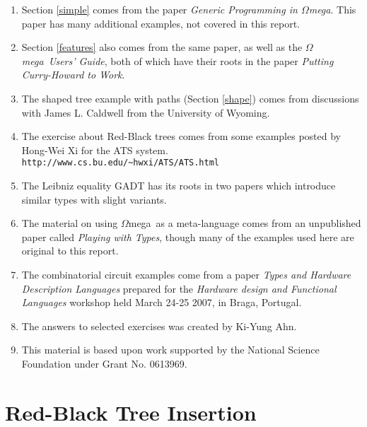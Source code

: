 \documentclass[11pt,twoside,A4]{llncs}
\newcommand{\om}{\emph{$\Omega$}mega}
\begin{document}
\begin{enumerate} 

\item Section \ref{simple} comes from the paper {\em  Generic Programming in \om}\cite{GenProgOmega}.
This paper has many additional examples, not covered in this report.

\item Section \ref{features} also comes from the same paper, as well as
the {\em \om\ Users' Guide}\cite{OmegaGuide}, both of which have their roots in the paper
{\em Putting Curry-Howard to Work}\cite{CurryHoward}.

\item The shaped tree example with paths (Section \ref{shape}) comes from
discussions with James L. Caldwell from the University of Wyoming.

\item The exercise about Red-Black trees comes from some examples
posted by Hong-Wei Xi for the ATS system.\\\verb+http://www.cs.bu.edu/~hwxi/ATS/ATS.html+

\item The Leibniz equality GADT has its roots in two 
papers\cite{HinzeHaskellWorkshop02,BaSw02}
which introduce similar types with slight variants.

\item The material on using \om\ as a meta-language comes
from an unpublished paper called {\em Playing with Types}\cite{Playing},
though many of the examples used here are original to this
report.

\item The combinatorial circuit examples come from a paper
{\em Types and Hardware Description Languages}\cite{HFL07}
prepared for the {\em Hardware design and Functional Languages}
workshop held March 24-25 2007, in Braga, Portugal.

\item The answers to selected exercises was created by Ki-Yung Ahn.

\item This material is based upon work supported by the National Science
Foundation under Grant No. 0613969.
\end{enumerate}





\appendix

\section{Red-Black Tree Insertion} \label{redblack}
\end{document}
